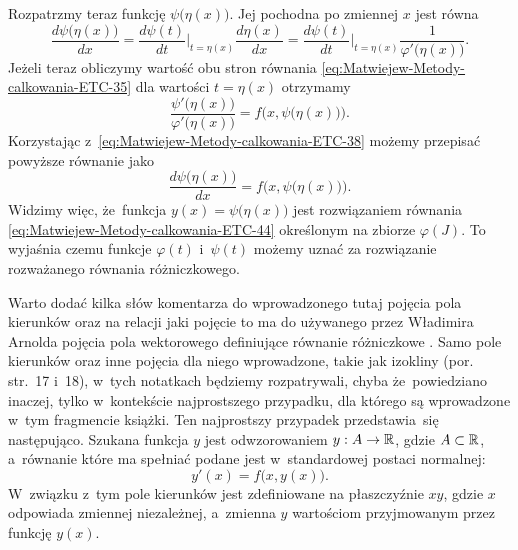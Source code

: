 \documentclass[a4paper,11pt]{article}
\numberwithin{equation}{section}
\begin{document}
Rozpatrzmy teraz funkcję $\psi\big( \eta( x ) \big)$. Jej pochodna po zmiennej $x$
jest równa
\begin{equation}
  \label{eq:Matwiejew-Metody-calkowania-ETC-43}
  \frac{ d \psi\big( \eta( x ) \big) }{ d x } =
  \frac{ d \psi( t ) }{ d t }\bigg|_{ t = \eta( x ) }
  \frac{ d \eta( x ) }{ d x } =
  \frac{ d \psi( t ) }{ d t }\bigg|_{ t = \eta( x ) }
  \frac{ 1 }{ \varphi'\big( \eta( x ) \big)}.
\end{equation}
Jeżeli teraz obliczymy wartość obu stron równania
\eqref{eq:Matwiejew-Metody-calkowania-ETC-35} dla wartości $t = \eta( x )$
otrzymamy
\begin{equation}
  \label{eq:Matwiejew-Metody-calkowania-ETC-44}
  \frac{ \psi'\big( \eta( x ) \big) }{ \varphi'\big( \eta( x ) \big) } =
  f\Big( x, \psi\big( \eta( x ) \big) \Big).
\end{equation}
Korzystając z~\eqref{eq:Matwiejew-Metody-calkowania-ETC-38} możemy przepisać
powyższe równanie jako
\begin{equation}
  \label{eq:Matwiejew-Metody-calkowania-ETC-45}
  \frac{ d \psi\big( \eta( x ) \big) }{ d x } =
  f\Big( x, \psi\big( \eta( x ) \big) \big).
\end{equation}
Widzimy więc, że~funkcja $y( x ) = \psi\big( \eta( x ) \big)$ jest rozwiązaniem
równania \eqref{eq:Matwiejew-Metody-calkowania-ETC-44} określonym na zbiorze
$\varphi( J )$. To wyjaśnia czemu funkcje $\varphi( t )$ i~$\psi( t )$ możemy uznać za
rozwiązanie rozważanego równania różniczkowego.

\VerSpaceFour





\noindent
{} Warto dodać kilka słów komentarza do wprowadzonego tutaj
pojęcia pola kierunków oraz na relacji jaki pojęcie to ma do używanego
przez Władimira Arnolda pojęcia pola wektorowego definiujące równanie
różniczkowe \cite{ArnoldRownaniaRozniczkoweZwyczajne1975}. Samo pole
kierunków oraz inne pojęcia dla niego wprowadzone, takie jak izokliny
(por. str.~17 i~18), w~tych notatkach będziemy rozpatrywali, chyba
że~powiedziano inaczej, tylko w~kontekście najprostszego przypadku, dla
którego są wprowadzone w~tym fragmencie książki. Ten najprostszy przypadek
przedstawia~się następująco. Szukana funkcja $y$ jest odwzorowaniem
$y : A \to \mathbb{R}$, gdzie $A \subset \mathbb{R}$, a~równanie które ma spełniać podane
jest w~standardowej postaci normalnej:
\begin{equation}
  \label{eq:Matwiejew-Metody-calkowania-ETC-46}
  y'( x ) = f\big( x, y( x ) \big).
\end{equation}
W~związku z~tym pole kierunków jest zdefiniowane na płaszczyźnie $xy$,
gdzie $x$ odpowiada zmiennej niezależnej, a~zmienna $y$ wartościom
przyjmowanym przez funkcję $y( x )$.
\end{document}
